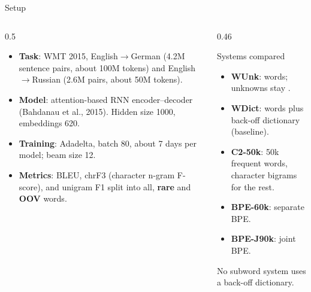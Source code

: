 \documentclass[aspectratio=169,11pt]{beamer}
\begin{document}
\begin{frame}{Setup}
  \begin{columns}[T]
    \begin{column}{0.5\textwidth}
      \small
      \begin{itemize}
        \item \textbf{Task}: WMT 2015, English$\to$German (4.2M sentence pairs, about 100M tokens) and English$\to$Russian (2.6M pairs, about 50M tokens).
        \item \textbf{Model}: attention-based RNN encoder--decoder (Bahdanau et al., 2015). Hidden size 1000, embeddings 620.
        \item \textbf{Training}: Adadelta, batch 80, about 7 days per model; beam size 12.
        \item \textbf{Metrics}: BLEU, chrF3 (character n-gram F-score), and unigram F1 split into all, \textbf{rare} and \textbf{OOV} words.
      \end{itemize}
    \end{column}
    \begin{column}{0.46\textwidth}
      \begin{block}{Systems compared}
        \small
        \begin{itemize}
          \item \textbf{WUnk}: words; unknowns stay .
          \item \textbf{WDict}: words plus back-off dictionary (baseline).
          \item \textbf{C2-50k}: 50k frequent words, character bigrams for the rest.
          \item \textbf{BPE-60k}: separate BPE.
          \item \textbf{BPE-J90k}: joint BPE.
        \end{itemize}
        No subword system uses a back-off dictionary.
      \end{block}
    \end{column}
  \end{columns}
\end{frame}
\end{document}

